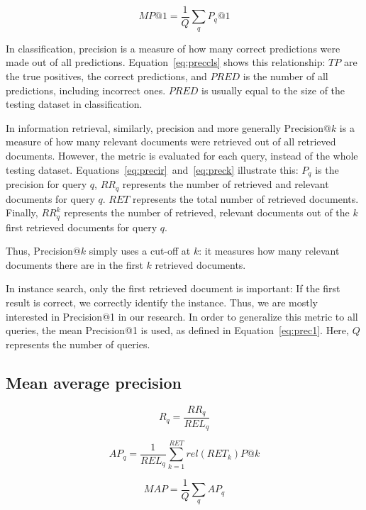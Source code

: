 \begin{equation}\label{eq:prec1}
MP@1 = \frac{1}{Q} \sum_q P_q@1
\end{equation}

In classification, precision is a measure of how many correct predictions
were made out of all predictions. Equation~\ref{eq:preccls} shows this
relationship: $TP$ are the true positives, the correct predictions,
and $PRED$ is the number of all predictions, including incorrect ones.
$PRED$ is usually equal to the size of the testing dataset in classification.

In information retrieval, similarly,
precision and more generally Precision$@k$ is a measure of how many
relevant documents were retrieved out of all retrieved documents.
However, the metric is evaluated for each query, instead of the whole
testing dataset.
Equations~\ref{eq:precir}~and~\ref{eq:preck} illustrate this: $P_q$ is
the precision for query $q$, $RR_q$ represents the number of retrieved
and relevant documents for query $q$.
$RET$ represents the total number of retrieved documents. Finally, $RR^k_q$
represents the number of retrieved, relevant documents out of the $k$ first
retrieved documents for query $q$.

Thus, Precision$@k$ simply uses a cut-off at $k$: it measures how many
relevant documents there are in the first $k$ retrieved documents.

In instance search, only the first retrieved document is important:
If the first result is correct, we correctly identify the instance.
Thus, we are mostly interested in Precision@1 in our research.
In order to generalize this metric to all queries, the mean Precision@1
is used, as defined in Equation~\ref{eq:prec1}. Here, $Q$ represents
the number of queries.

\subsection{Mean average precision}
\begin{equation}\label{eq:recall}
R_q = \frac{RR_q}{REL_q}
\end{equation}

\begin{equation}\label{eq:ap}
AP_q = \frac{1}{REL_q} \sum_{k=1}^{RET} rel(RET_k)P@k
\end{equation}

\begin{equation}\label{eq:map}
MAP = \frac{1}{Q} \sum_q AP_q
\end{equation}

